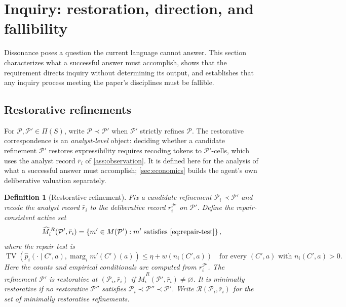 \documentclass[11pt]{article}
\newtheorem{definition}[assumption]{Definition}
\theoremstyle{definition}
\newcommand{\emptysetset}{\varnothing}
\newcommand{\TV}{\operatorname{TV}}
\newcommand{\marg}[1]{\operatorname{marg}_{#1}}
\begin{document}
\section{Inquiry: restoration, direction, and fallibility}
\label{sec:inquiry}

Dissonance poses a question the current language cannot answer.
This section characterizes what a successful answer must accomplish, shows that the requirement directs inquiry without determining its output, and establishes that any inquiry process meeting the paper's disciplines must be fallible.

\subsection{Restorative refinements}

For $\mathcal P,\mathcal P'\in\Pi(S)$, write $\mathcal P\prec\mathcal P'$ when $\mathcal P'$ strictly refines $\mathcal P$.
The restorative correspondence is an \emph{analyst-level} object: deciding whether a candidate refinement $\mathcal P'$ restores expressibility requires recoding tokens to $\mathcal P'$-cells, which uses the analyst record $\bar r_i$ of \cref{ass:observation}.
It is defined here for the analysis of what a successful answer must accomplish; \cref{sec:economics} builds the agent's own deliberative valuation separately.

\begin{definition}[Restorative refinement]
\label{def:restorative}
Fix a candidate refinement $\mathcal P_i\prec\mathcal P'$ and recode the analyst record $\bar r_i$ to the deliberative record $r_i^{\mathcal P'}$ on $\mathcal P'$.
Define the \emph{repair-consistent active set}
\[
\widehat M_i^{\,R}(\mathcal P',\bar r_i)
=
\left\{
m'\in M(\mathcal P'):
m'\text{ satisfies \cref{eq:repair-test}}
\right\},
\]
where the \emph{repair test} is
\begin{equation}
\TV\!\left(
\hat p_i(\cdot\mid C',a),
\marg{i}m'(C')(a)
\right)
\leq
\eta+w\!\left(n_i(C',a)\right)
\quad
\text{for every $(C',a)$ with }n_i(C',a)>0.
\label{eq:repair-test}
\end{equation}
Here the counts and empirical conditionals are computed from $r_i^{\mathcal P'}$.
The refinement $\mathcal P'$ is \emph{restorative} at $(\mathcal P_i,\bar r_i)$ if $\widehat M_i^{\,R}(\mathcal P',\bar r_i)\neq\emptysetset$.
It is \emph{minimally restorative} if no restorative $\mathcal P''$ satisfies $\mathcal P_i\prec\mathcal P''\prec\mathcal P'$.
Write $\mathcal R(\mathcal P_i,\bar r_i)$ for the set of minimally restorative refinements.
\end{definition}
\end{document}
